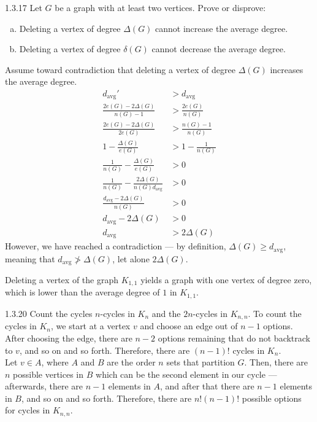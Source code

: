 \documentclass[9pt]{extarticle}
\begin{document}
  \begin{problem}{1.3.17}
    Let $G$ be a graph with at least two vertices. Prove or disprove:
    \begin{enumerate}[(a)]
      \item Deleting a vertex of degree $\Delta(G)$ cannot increase the average degree.
      \item Deleting a vertex of degree $\delta(G)$ cannot decrease the average degree.
    \end{enumerate}
    \tcblower
    \begin{tcolorbox}[colback = white, title = (a), breakable]
      Assume toward contradiction that deleting a vertex of degree $\Delta(G)$ increases the average degree.
      \begin{align*}
        d_{\textrm{avg}}' &> d_{\textrm{avg}} \\
        \frac{2e(G) - 2\Delta(G)}{n(G) - 1} &> \frac{2e(G)}{n(G)}\\
        \frac{2e(G) - 2\Delta(G)}{2e(G)} &> \frac{n(G) - 1}{n(G)}\\
        1 - \frac{\Delta(G)}{e(G)} &> 1 - \frac{1}{n(G)}\\
        \frac{1}{n(G)} - \frac{\Delta(G)}{e(G)} &> 0 \\
        \frac{1}{n(G)} - \frac{2\Delta(G)}{n(G)d_{\textrm{avg}}} &> 0 \\
        \frac{d_{\textrm{avg}} - 2\Delta(G)}{n(G)} &> 0\\
        d_{\textrm{avg}} - 2\Delta(G) &> 0\\
        d_{\textrm{avg}} &> 2\Delta(G)
      \end{align*}
      However, we have reached a contradiction --- by definition, $\Delta(G) \geq d_{\textrm{avg}}$, meaning that $d_{\textrm{avg}}\not> \Delta(G)$, let alone $2\Delta(G)$.
    \end{tcolorbox}
    \begin{tcolorbox}[colback = white, title = (b), breakable]
      Deleting a vertex of the graph $K_{1,1}$ yields a graph with one vertex of degree zero, which is lower than the average degree of $1$ in $K_{1,1}$.
    \end{tcolorbox}
  \end{problem}
  \begin{problem}{1.3.20}
    Count the cycles $n$-cycles in $K_n$ and the $2n$-cycles in $K_{n,n}$.
    \tcblower
    To count the cycles in $K_n$, we start at a vertex $v$ and choose an edge out of $n-1$ options. After choosing the edge, there are $n-2$ options remaining that do not backtrack to $v$, and so on and so forth. Therefore, there are $(n-1)!$ cycles in $K_n$.\\

    Let $v\in A$, where $A$ and $B$ are the order $n$ sets that partition $G$. Then, there are $n$ possible vertices in $B$ which can be the second element in our cycle --- afterwards, there are $n-1$ elements in $A$, and after that there are $n-1$ elements in $B$, and so on and so forth. Therefore, there are $n!(n-1)!$ possible options for cycles in $K_{n,n}$.
  \end{problem}
\end{document}

